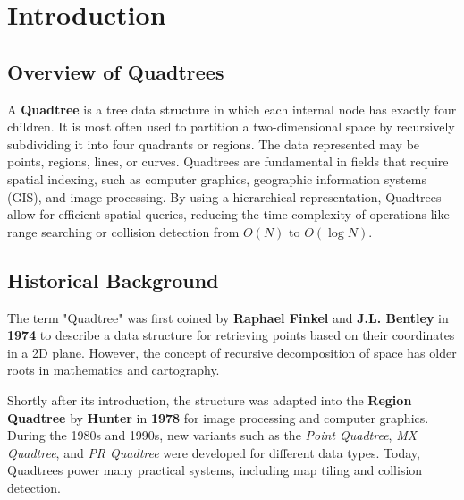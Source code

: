 \section {Introduction}

\subsection{Overview of Quadtrees}
A \textbf{Quadtree} is a tree data structure in which each internal node has exactly four children. It is most often used to partition a two-dimensional space by recursively subdividing it into four quadrants or regions. The data represented may be points, regions, lines, or curves. Quadtrees are fundamental in fields that require spatial indexing, such as computer graphics, geographic information systems (GIS), and image processing. By using a hierarchical representation, Quadtrees allow for efficient spatial queries, reducing the time complexity of operations like range searching or collision detection from $O(N)$ to $O(\log N)$.

\subsection{Historical Background}
The term "Quadtree" was first coined by \textbf{Raphael Finkel} and \textbf{J.L. Bentley} in \textbf{1974} to describe a data structure for retrieving points based on their coordinates in a 2D plane. However, the concept of recursive decomposition of space has older roots in mathematics and cartography. 

Shortly after its introduction, the structure was adapted into the \textbf{Region Quadtree} by \textbf{Hunter} in \textbf{1978} for image processing and computer graphics. During the 1980s and 1990s, new variants such as the \textit{Point Quadtree}, \textit{MX Quadtree}, and \textit{PR Quadtree} were developed for different data types. Today, Quadtrees power many practical systems, including map tiling and collision detection.


\clearpage